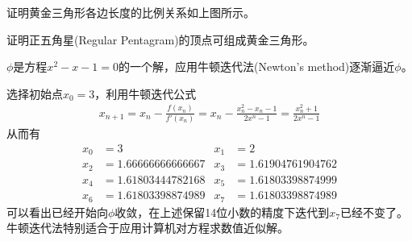 \begin{question}
  证明黄金三角形各边长度的比例关系如上图所示。
\end{question}

\begin{question}
  证明正五角星(Regular Pentagram)的顶点可组成黄金三角形。
  \begin{center}
  \end{center}
\end{question}

\begin{example}[数值逼近]
  $\phi$是方程$x^2-x-1=0$的一个解，应用牛顿迭代法(Newton's method)逐渐逼近$\phi$。
\end{example}

选择初始点$x_0=3$，利用牛顿迭代公式
\begin{align*}
  x_{n+1}=x_n-\frac{f(x_n)}{f'(x_n)}=x_n-\frac{x_n^2-x_n-1}{2x^n-1}=\frac{x_n^2+1}{2x^n-1}
\end{align*}
从而有
\begin{align*}
  x_0&=3 &
  x_1&=2\\
  x_2&=1.66666666666667 &
  x_3&=1.61904761904762\\
  x_4&=1.61803444782168 &
  x_5&=1.61803398874999\\
  x_6&=1.61803398874989 &
  x_7&=1.61803398874989
\end{align*}
可以看出已经开始向$\phi$收敛，在上述保留14位小数的精度下迭代到$x_7$已经不变了。牛顿迭代法特别适合于应用计算机对方程求数值近似解。
